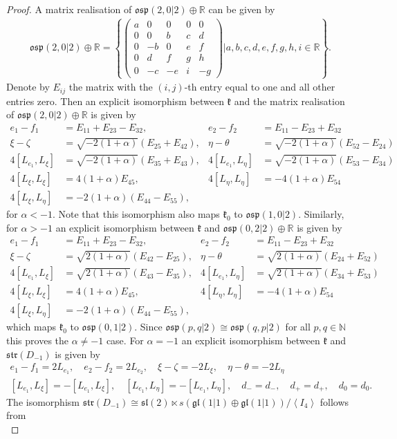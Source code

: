 \documentclass{amsart}
\numberwithin{theorem}{section}
\theoremstyle{definition}
\theoremstyle{remark}
\def\R{\mathds{R} }
\def\N{\mathds{N} }
\newcommand{\mf}[1]{\mathfrak{#1}}
\newcommand{\ds}[1]{\mathds{#1}}
\begin{document}
\begin{proof}
A matrix realisation of $\mf{osp}(2,0|2)\oplus \R$ can be given by
\begin{align*}
\mf{osp}(2,0|2)\oplus \R = \left\lbrace \left(\begin{array}{ccc|cc}
a & 0 & 0 & 0 & 0 \\
0 & 0 & b & c & d \\
0 & -b & 0 & e &  f \\ \hline
0 & d & f & g & h\\
0 & -c & -e & i & -g
\end{array}\right)| a,b,c,d,e,f,g,h,i\in \ds R \right\rbrace.
\end{align*}
Denote by $E_{ij}$ the matrix with the $(i,j)$-th entry equal to one and all other entries zero. Then an explicit isomorphism between $\mf k$ and the matrix realisation of $\mf{osp}(2,0|2)\oplus \R$ is given by
\begin{align*}
e_1-f_1 &=E_{11}+E_{23}-E_{32}, & e_2-f_2 &= E_{11}-E_{23}+E_{32}\\
\xi-\zeta &= \sqrt{-2(1+\alpha)}(E_{25}+E_{42}), & \eta-\theta &= \sqrt{-2(1+\alpha)}(E_{52}-E_{24})\\
4[L_{e_1},L_\xi] &= \sqrt{-2(1+\alpha)}(E_{35}+E_{43}), & 4[L_{e_1},L_\eta]&= \sqrt{-2(1+\alpha)}(E_{53}-E_{34})\\
4[L_\xi,L_\xi] &= 4(1+\alpha)E_{45}, & 4[L_\eta,L_\eta]&= -4(1+\alpha)E_{54}\\
4[L_\xi,L_\eta] &= -2(1+\alpha)(E_{44}-E_{55}),
\end{align*}
for $\alpha < -1$. Note that this isomorphism also maps $\mf k_0$ to $\mf{osp}(1,0|2)$. Similarly, for $\alpha>-1$ an explicit isomorphism between $\mf k$ and $\mf{osp}(0,2|2)\oplus \R$ is given by
\begin{align*}
e_1-f_1 &=E_{11}+E_{23}-E_{32}, & e_2-f_2 &= E_{11}-E_{23}+E_{32}\\
\xi-\zeta &= \sqrt{2(1+\alpha)}(E_{42}-E_{25}), & \eta-\theta &= \sqrt{2(1+\alpha)}(E_{24}+E_{52})\\
4[L_{e_1},L_\xi] &= \sqrt{2(1+\alpha)}(E_{43}-E_{35}), & 4[L_{e_1},L_\eta]&= \sqrt{2(1+\alpha)}(E_{34}+E_{53})\\
4[L_\xi,L_\xi] &= 4(1+\alpha)E_{45}, & 4[L_\eta,L_\eta]&= -4(1+\alpha)E_{54}\\
4[L_\xi,L_\eta] &= -2(1+\alpha)(E_{44}-E_{55}),
\end{align*}
which maps $\mf k_0$ to $\mf{osp}(0,1|2)$. Since $\mf{osp}(p,q|2)\cong \mf{osp}(q,p|2)$ for all $p,q\in\ds\N$ this proves the $\alpha\neq -1$ case. For $\alpha=-1$ an explicit isomorphism between $\mf k$ and $\mf{str}(D_{-1})$ is given by
\begin{gather*}
e_1-f_1 =2L_{e_1},\quad e_2-f_2 = 2L_{e_2}, \quad \xi-\zeta = -2L_{\xi}, \quad \eta-\theta = -2L_{\eta}\\
[L_{e_1},L_\xi] = -[L_{e_1},L_\xi], \quad [L_{e_1},L_\eta]= -[L_{e_1},L_\eta], \quad d_- = d_-, \quad d_+ = d_+, \quad d_0 = d_0.
\end{gather*}
The isomorphism $\mf{str}(D_{-1}) \cong \mf{sl}(2)\ltimes s(\mf{gl}(1|1)\oplus\mf{gl}(1|1))/\left<I_4\right>$ follows from \cite[Section 6.1]{BC2}\\
\end{proof}
\end{document}
